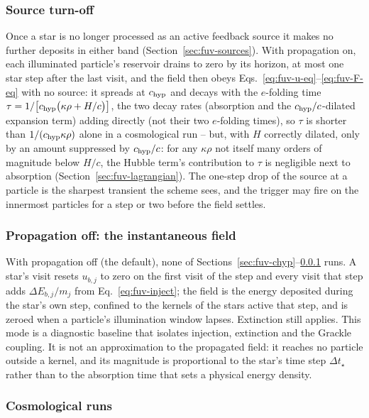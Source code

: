 \subsubsection{Source turn-off}
\label{sec:fuv-turnoff}

Once a star is no longer processed as an active feedback source it makes
no further deposits in either band (Section~\ref{sec:fuv-sources}).
With propagation on, each illuminated particle's reservoir drains to
zero by its horizon, at most one star step after the last visit, and
the field then obeys Eqs.~\ref{eq:fuv-u-eq}--\ref{eq:fuv-F-eq} with no
source: it spreads at $c_{\rm hyp}$ and decays with the $e$-folding time
$\tau = 1/\!\left[c_{\rm hyp}\big(\kappa\rho + H/c\big)\right]$, the two
decay rates (absorption and the $c_{\rm hyp}/c$-dilated expansion term)
adding directly (not their two $e$-folding times), so $\tau$ is shorter
than $1/(c_{\rm hyp}\kappa\rho)$ alone in a cosmological run -- but, with
$H$ correctly dilated, only by an amount suppressed by $c_{\rm hyp}/c$:
for any $\kappa\rho$ not itself many orders of magnitude below $H/c$,
the Hubble term's contribution to $\tau$ is negligible next to
absorption (Section~\ref{sec:fuv-lagrangian}).
The one-step drop of the source at a particle is the sharpest transient
the scheme sees, and the trigger may fire on the innermost particles for
a step or two before the field settles.

\subsubsection{Propagation off: the instantaneous field}
\label{sec:fuv-instantaneous}

With propagation off (the default), none of
Sections~\ref{sec:fuv-chyp}--\ref{sec:fuv-turnoff} runs. A star's
visit resets $u_{b,j}$ to zero on the first visit of the step and every
visit that step adds $\Delta E_{b,j}/m_j$ from Eq.~\ref{eq:fuv-inject};
the field is the energy deposited during the star's own step, confined
to the kernels of the stars active that step, and is zeroed when a
particle's illumination window lapses. Extinction still applies. This
mode is a diagnostic baseline that isolates injection, extinction and
the Grackle coupling. It is not an approximation to the propagated
field: it reaches no particle outside a kernel, and its magnitude is
proportional to the star's time step $\Delta t_\star$ rather than to the
absorption time that sets a physical energy density.

\subsubsection{Cosmological runs}
\label{sec:fuv-cosmo}


